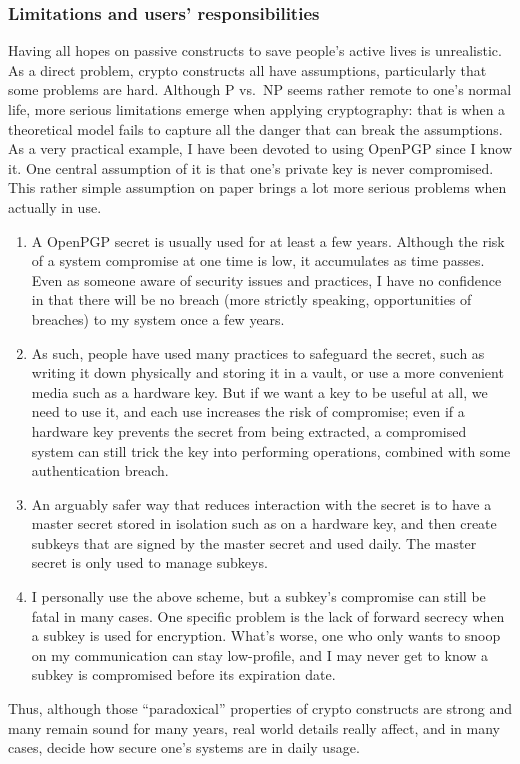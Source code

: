 \documentclass[10pt]{article}
\begin{document}
\subsubsection{Limitations and users' responsibilities}
\label{sec.crypto.limit}
Having all hopes on passive constructs to save people's active lives is
unrealistic. As a direct problem, crypto constructs all have assumptions,
particularly that some problems are hard.  Although P vs.\ NP seems rather
remote to one's normal life,  more serious limitations emerge when applying
cryptography: that is when a theoretical model fails to capture all the danger
that can break the assumptions. As a very practical example, I have been
devoted to using OpenPGP since I know it. One central assumption of it is that
one's private key is never compromised. This rather simple assumption on paper
brings a lot more serious problems when actually in use.
\begin{enumerate}
\item A OpenPGP secret is usually used for at least a few years. Although the
	risk of a system compromise at one time is low, it accumulates as time
	passes.  Even as someone aware of security issues and practices, I have no
	confidence in that there will be no breach (more strictly speaking,
	opportunities of breaches) to my system once a few years. 
\item As such, people have used many practices to safeguard the secret, such as
	writing it down physically and storing it in a vault, or use a more
	convenient media such as a hardware key. But if we want a key to be useful
	at all, we need to use it, and each use increases the risk of compromise;
	even if a hardware key prevents the secret from being extracted, a
	compromised system can still trick the key into performing operations,
	combined with some authentication breach. 
\item An arguably safer way that reduces interaction with the secret is to have
	a master secret stored in isolation such as on a hardware key, and then
	create subkeys that are signed by the master secret and used daily. The
	master secret is only used to manage subkeys.
\item I personally use the above scheme, but a subkey's compromise can still be
	fatal in many cases. One specific problem is the lack of forward secrecy
	when a subkey is used for encryption. What's worse, one who only wants
	to snoop on my communication can stay low-profile, and I may never get to
	know a subkey is compromised before its expiration date.
\end{enumerate}
Thus, although those ``paradoxical'' properties of crypto constructs are
strong and many remain sound for many years, real world details really affect,
and in many cases, decide how secure one's systems are in daily usage. 
\end{document}

